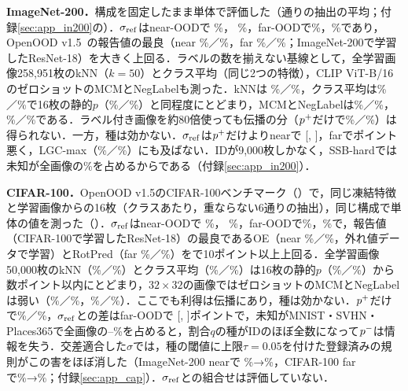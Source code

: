 \textbf{ImageNet-200．}構成を固定したまま単体で評価した（\NInTwoZeroZeroNDraws{}通りの抽出の平均；付録\ref{sec:app_in200}の）．$\sigma_{\mathrm{ref}}$はnear-OODで\AUC{} \NRITNearAuroc\%，\FPR{} \NRITNearFpr\%，far-OODで\NRITFarAuroc\%，\NRITFarFpr\%であり，OpenOOD v1.5~\cite{zhang2023openood}の報告値の最良（near \NInTwoZeroZeroBestPubNearAuroc\%／\NInTwoZeroZeroBestPubNearFpr\%，far \NInTwoZeroZeroBestPubFarAuroc\%／\NInTwoZeroZeroBestPubFarFpr\%；ImageNet-200で学習したResNet-18）を大きく上回る．ラベルの数を揃えない基線として，全学習画像258,951枚のkNN（$k{=}50$）とクラス平均（同じ2つの特徴），CLIP ViT-B/16のゼロショットのMCMとNegLabelも測った．kNNは\FPR{} \NInTwoZeroZeroKnnAllKFiveZeroNearFpr\%／\NInTwoZeroZeroKnnAllKFiveZeroFarFpr\%，クラス平均は\NInTwoZeroZeroNcmAllNearFpr\%／\NInTwoZeroZeroNcmAllFarFpr\%で16枚の静的$p$（\NInTwoZeroZeroStaticNearFpr\%／\NInTwoZeroZeroStaticFarFpr\%）と同程度にとどまり，MCMとNegLabelは\NInTwoZeroZeroMcmClipNearFpr\%／\NInTwoZeroZeroMcmClipFarFpr\%，\NInTwoZeroZeroNeglabelClipNearFpr\%／\NInTwoZeroZeroNeglabelClipFarFpr\%である．ラベル付き画像を約80倍使っても伝播の分（$p^{+}$だけで\NRITNearLpFpr\%／\NRITFarLpFpr\%）は得られない．一方，種は効かない．$\sigma_{\mathrm{ref}}$は$p^{+}$だけよりnearで\NRITNearDLp{} [\NRITNearDLpLo, \NRITNearDLpHi]，farで\NRITFarDLp{}ポイント悪く，LGC-max（\NInTwoZeroZeroLgcNearFpr\%／\NInTwoZeroZeroLgcFarFpr\%）にも及ばない．IDが9,000枚しかなく，SSB-hardでは未知が全画像の\NInTwoZeroZeroMixSsbHard\%を占めるからである（付録\ref{sec:app_in200}）．

\textbf{CIFAR-100．}OpenOOD v1.5のCIFAR-100ベンチマーク（）で，同じ凍結特徴と学習画像からの16枚（クラスあたり，重ならない6通りの抽出），同じ構成で単体の値を測った（）．$\sigma_{\mathrm{ref}}$はnear-OODで\AUC{} \NRCFNearAuroc\%，\FPR{} \NRCFNearFpr\%，far-OODで\NRCFFarAuroc\%，\NRCFFarFpr\%で，報告値（CIFAR-100で学習したResNet-18）の最良であるOE（near \NCifarBestPubNearAuroc\%／\NCifarBestPubNearFpr\%，外れ値データで学習）とRotPred（far \NCifarBestPubFarAuroc\%／\NCifarBestPubFarFpr\%）を\AUC{}で10ポイント以上上回る．全学習画像50,000枚のkNN（\NCifarKnnAllKFiveZeroNearFpr\%／\NCifarKnnAllKFiveZeroFarFpr\%）とクラス平均（\NCifarNcmAllNearFpr\%／\NCifarNcmAllFarFpr\%）は16枚の静的$p$（\NCifarStaticNearFpr\%／\NCifarStaticFarFpr\%）から数ポイント以内にとどまり，$32\times32$の画像ではゼロショットのMCMとNegLabelは弱い（\NCifarMcmClipNearFpr\%／\NCifarMcmClipFarFpr\%，\NCifarNeglabelClipNearFpr\%／\NCifarNeglabelClipFarFpr\%）．ここでも利得は伝播にあり，種は効かない．$p^{+}$だけで\NRCFNearLpFpr\%／\NRCFFarLpFpr\%，$\sigma_{\mathrm{ref}}$との差はfar-OODで\NRCFFarDLp{} [\NRCFFarDLpLo, \NRCFFarDLpHi]ポイントで，未知がMNIST・SVHN・Places365で全画像の\NCifarMixFarHiMin{}--\NCifarMixFarHiMax\%を占めると，割合$q$の種がIDのほぼ全数になって$p^{-}$は情報を失う．交差適合した$\sigma$では，種の閾値に上限$\tau{=}0.05$を付けた登録済みの規則がこの害をほぼ消した（ImageNet-200 nearで\FPR{} \NInTwoZeroZeroMainNearFpr\%→\NInTwoZeroZeroStoreycNearFpr\%，CIFAR-100 farで\NCifarMainFarFpr\%→\NCifarStoreycFarFpr\%；付録\ref{sec:app_cap}）．$\sigma_{\mathrm{ref}}$との組合せは評価していない．
